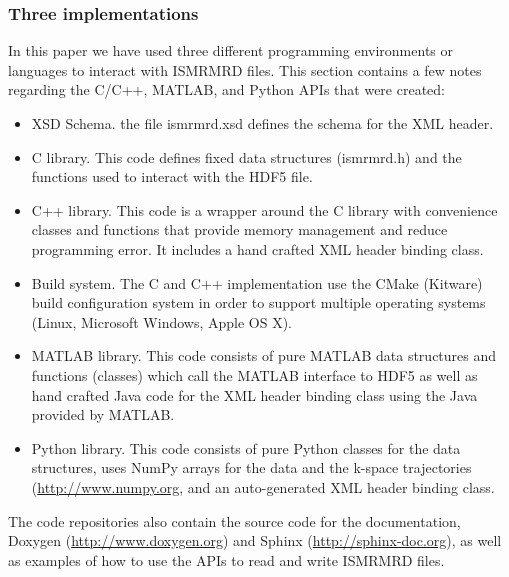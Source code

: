 \documentclass[12pt]{article}
\begin{document}
\subsubsection*{Three implementations}
In this paper we have used three different programming environments or languages to interact with ISMRMRD files. This section contains a few notes regarding the C/C++, MATLAB, and Python APIs that were created:
\begin{itemize}
\item{XSD Schema.} the file ismrmrd.xsd defines the schema for the XML header.
\item{C library.}  This code defines fixed data structures (ismrmrd.h) and the functions used to interact with the HDF5 file.
\item{C++ library.} This code is a wrapper around the C library with convenience classes and functions that provide memory management and reduce programming error.  It includes a hand crafted XML header binding class.  
\item{Build system.} The C and C++ implementation use the CMake (Kitware) build configuration system in order to support multiple operating systems (Linux, Microsoft Windows, Apple OS X).
\item{MATLAB library.} This code consists of pure MATLAB data structures and functions (classes) which call the MATLAB interface to HDF5 as well as hand crafted Java code for the XML header binding class using the Java provided by MATLAB.
\item{Python library.} This code consists of pure Python classes for the data structures, uses NumPy arrays for the data and the k-space trajectories (\url{http://www.numpy.org}, and an auto-generated XML header binding class.
\end{itemize}

The code repositories also contain the source code for the documentation, Doxygen (\url{http://www.doxygen.org}) and Sphinx (\url{http://sphinx-doc.org}), as well as examples of how to use the APIs to read and write ISMRMRD files.
\end{document}
